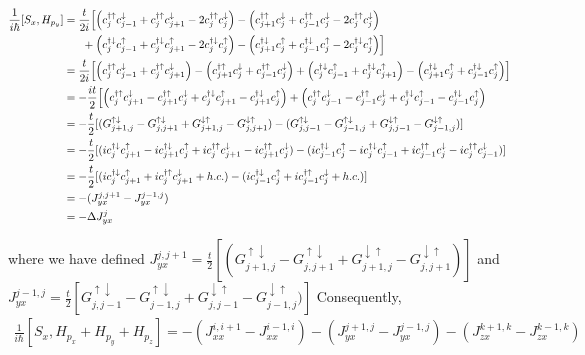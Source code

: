 \documentclass[10pt,prb,showpacs,amssymb,floatfix]{revtex4-1}
\newcommand{\dg}{\dagger}
\newcommand{\dna}{\downarrow}
\newcommand{\dn}{\downarrow}
\newcommand{\nn}{\nonumber}
\newcommand{\upa}{\uparrow}
\newcommand{\Dlt}{\Delta}
\begin{document}
\begin{align}
\frac{1}{i\hbar}[S_x,H_{p_y}] &=  \frac{t}{2i} \Big{[} \Big{(} c_{j}^{\dagger \upa} c_{j-1}^\dn  + c_{j}^{\dagger \upa} c_{j+1}^\dn    - 2 c_{j}^{\dagger \upa} c_{j}^\dn  \Big{)} 
 -   \Big{(} c_{j+1}^{\dagger \upa} c_{j}^\dna  +c_{j-1}^{\dagger \upa} c_{j}^\dna   - 2 c_{j}^{\dagger \upa} c_{j}^\dna   \Big{)}  \nn\\ & ~~~~~
 +  \Big{(}c_{j}^{\dg\dna} c_{j-1}^\upa  +c_{j}^{\dagger \dna} c_{j+1}^\upa  - 2 c_{j}^{\dagger \dna} c_{j}^\upa    \Big{)} 
  -    \Big{(} c_{j+1}^{\dagger \dn} c_{j}^\upa  + c_{j-1}^{\dagger \dn} c_{j}^\upa    - 2 c_{j}^{\dagger \dn} c_{j}^\upa  \Big{)}  \Big{]} \\
  &=  \frac{t}{2i} \Big{[} \Big{(} c_{j}^{\dagger \upa} c_{j-1}^\dn  + c_{j}^{\dagger \upa} c_{j+1}^\dn   \Big{)} 
 -   \Big{(} c_{j+1}^{\dagger \upa} c_{j}^\dna  +c_{j-1}^{\dagger \upa} c_{j}^\dna     \Big{)} 
 +  \Big{(}c_{j}^{\dg\dna} c_{j-1}^\upa  +c_{j}^{\dagger \dna} c_{j+1}^\upa      \Big{)} 
  -    \Big{(} c_{j+1}^{\dagger \dn} c_{j}^\upa  + c_{j-1}^{\dagger \dn} c_{j}^\upa      \Big{)}  \Big{]} \nn\\
  &=  -\frac{it}{2} \Big{[} \Big{(}  c_{j}^{\dagger \upa} c_{j+1}^\dn - c_{j+1}^{\dagger \upa} c_{j}^\dna  + c_{j}^{\dagger \dna} c_{j+1}^\upa  - c_{j+1}^{\dagger \dn} c_{j}^\upa   \Big{)} 
 +   \Big{(} c_{j}^{\dagger \upa} c_{j-1}^\dn    - c_{j-1}^{\dagger \upa} c_{j}^\dna + c_{j}^{\dg\dna} c_{j-1}^\upa   - c_{j-1}^{\dagger \dn} c_{j}^\upa  \Big{)}  \nn\\
  & = -\frac{t}{2} [(G^{\upa\dna}_{j+1,j} - G^{\upa\dna}_{j,j+1} + G^{\dna\upa}_{j+1,j} - G^{\dna\upa}_{j,j+1} ) - ( G^{\upa\dna}_{j,j-1} - G^{\upa\dna}_{j-1,j} +  G^{\dna\upa}_{j,j-1} -G^{\dna\upa}_{j-1,j}   )] \nn\\
  & =  -\frac{t}{2} [(  ic_j^{\dg \dna} c_{j+1}^\upa - ic_{j+1}^{\dg \dna} c_{j}^\upa + ic_j^{\dg \upa} c_{j+1}^\dna - ic_{j+1}^{\dg \upa} c_{j}^\dna ) - (ic_{j-1}^{\dg \dna} c_{j}^\upa - ic_j^{\dg \dna} c_{j-1}^\upa  + ic_{j-1}^{\dg \upa} c_{j}^\dna -ic_j^{\dg \upa} c_{j-1}^\dna )   ] \nn\\
  &=  -\frac{t}{2} [(  ic_j^{\dg \dna} c_{j+1}^\upa + ic_j^{\dg \upa} c_{j+1}^\dna  + h.c. ) - (ic_{j-1}^{\dg \dna} c_{j}^\upa   + ic_{j-1}^{\dg \upa} c_{j}^\dna + h.c.  )   ] \nn\\
  &= -(J^{j,j+1}_{yx} - J^{j-1,j}_{yx}) \nn\\
  &= - \Dlt J^j_{yx}
\end{align}

where we have defined $J^{j,j+1}_{yx} = \frac{t}{2} [(G^{\upa\dna}_{j+1,j} - G^{\upa\dna}_{j,j+1} + G^{\dna\upa}_{j+1,j} - G^{\dna\upa}_{j,j+1} )]$ and $J^{j-1,j}_{yx} = \frac{t}{2} [G^{\upa\dna}_{j,j-1} - G^{\upa\dna}_{j-1,j} +  G^{\dna\upa}_{j,j-1} -G^{\dna\upa}_{j-1,j}   )]$ Consequently,
\begin{align}
\frac{1}{i\hbar}[S_x,H_{p_x} + H_{p_y}  + H_{p_z} ] = -(J^{i,i+1}_{xx} - J^{i-1,i}_{xx}) -(J^{j+1,j}_{yx} - J^{j-1,j}_{yx})  -(J^{k+1,k}_{zx} - J^{k-1,k}_{zx}) 
\end{align}
\end{document}
